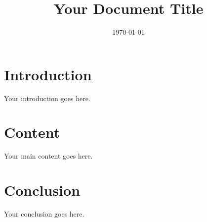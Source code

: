 \documentclass[12pt,a4paper]{article}
\title{Your Document Title}
\date{\today}
\begin{document}
\maketitle

\section{Introduction}
Your introduction goes here.

\section{Content}
Your main content goes here.

\section{Conclusion}
Your conclusion goes here.
\end{document}
